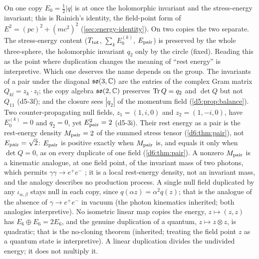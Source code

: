 \begin{remark}
\label{d5:rem:twoE0}
On one copy $E_0=\tfrac12|q|$ is at once the holomorphic invariant and the stress-energy invariant; this is Rainich's identity, the field-point
form of $E^2=(pc)^2+(mc^2)^2$ (\cref{sec:energy-identity}). On two copies the two separate. The stress-energy content ($T_{\rm tot}$,
$\sum_kE_0^{(k)}$, $E_{\rm pair}$) is preserved by the whole three-sphere, the holomorphic invariant $q_2$ only by the circle (fixed). Reading this as the
point where duplication changes the meaning of ``rest energy'' is interpretive. Which one deserves the name depends on the group. The invariants of a pair
under the diagonal $\mathfrak{so}(3,\mathbb{C})$ are the entries of the complex Gram matrix $Q_{kl}=z_k\cdot z_l$; the copy algebra $\mathfrak{so}(2,\mathbb{C})$ preserves
$\operatorname{Tr} Q=q_2$ and $\det Q$ but not $Q_{11}$ (d5-3f); and the closure sees $|q_2|$ of the momentum field (\cref{d5:prop:balance}). Two
counter-propagating null fields, $z_1=(1,i,0)$ and $z_2=(1,-i,0)$, have $E_0^{(k)}=0$ and $q_2=0$, yet $E_{\rm pair}^2=2$ (d5-3i). Their rest energy as a pair is the rest-energy density $M_{\rm pair}=2$ of the summed stress tensor (\cref{d6:thm:pair}), not
$E_{\rm pair}=\sqrt2$: $E_{\rm pair}$ is positive exactly when $M_{\rm pair}$ is, and equals it only when $\det Q=0$, as on every duplicate of one field
(\cref{d6:thm:pair}). A nonzero $M_{\rm pair}$ is a kinematic analogue, at one field point, of the invariant mass of two photons, which permits $\gamma\gamma\to e^+e^-$
\cite{BreitWheeler34}; it is a local rest-energy density, not an invariant mass, and the analogy describes no production process. A single null field
duplicated by any $\iota_{\alpha,\beta}$ stays null in each copy, since $q(\alpha z)=\alpha^2q(z)$; that is the analogue of the absence of
$\gamma\to e^+e^-$ in vacuum (the photon kinematics inherited; both analogies interpretive). No isometric linear map copies the energy, $z\mapsto(z,z)$ has $E_6\oplus E_6=2E_6$, and the
genuine duplication of a quantum, $z\mapsto z\otimes z$, is quadratic; that is the no-cloning theorem \cite{WoottersZurek82} (inherited; treating the field point $z$ as a quantum state is interpretive). A
linear duplication divides the undivided energy; it does not multiply it.
\end{remark}

